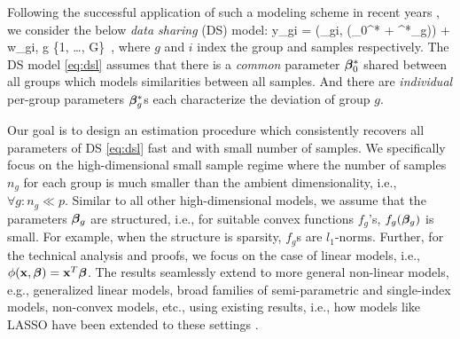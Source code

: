 Following the successful application of such a modeling scheme in recent years \cite{domu16, grti16,  olvi14, olvi15}, we consider the below \emph{data sharing} (DS) model: 
\beq
\label{eq:dsl}
y_{gi} = \phi(\x_{gi}, (\bbeta_0^* + \bbeta^*_g)) + w_{gi}, \quad g \in \{1, \dots, G\}~,
\eeq
where $g$ and $i$ index the group and samples respectively. 
The DS model \eqref{eq:dsl} assumes that there is a \emph{common} parameter $\boldsymbol{\beta}^*_0$ shared between all groups which models similarities between all samples. And there are \emph{individual} per-group parameters $\boldsymbol{\beta}_g^*$s each characterize the deviation of group $g$.%

Our goal is to design an estimation procedure which consistently recovers all parameters of DS \eqref{eq:dsl} fast and with small number of samples.
We specifically focus on the high-dimensional small sample regime where the number of samples $n_g$ for each group is much smaller than the ambient 
dimensionality, i.e., $\forall g: n_g \ll p$. Similar to all other high-dimensional models, we assume that the parameters $\boldsymbol{\beta}_g$ are structured, i.e., for suitable convex functions $f_g$'s, $f_g(\boldsymbol{\beta}_g)$ is small.
For example, when the structure is sparsity, $f_g$s are $l_1$-norms. Further, for the technical analysis and proofs,
we focus on the case of linear models, i.e., $\phi(\mathbf{x},\boldsymbol{\beta}) = \mathbf{x}^T \boldsymbol{\beta}$. The results
seamlessly extend to more general non-linear models, e.g., generalized linear models, broad families of semi-parametric and single-index models, non-convex models, etc., using
existing results, i.e., how models like LASSO have been extended to these settings \cite{Kakade2010-st, negahban2012restricted, Plan2013-nx, Plan2016-de, Yang2016-zd}. %


